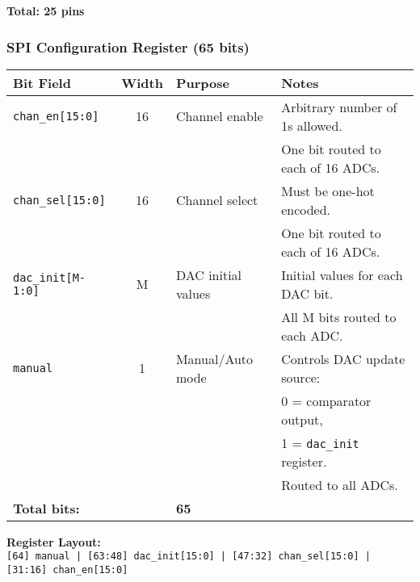 \documentclass[aspectratio=169]{beamer}
\begin{document}
\begin{frame}
\begin{center}
    \vspace{0.3cm}
    \textbf{Total: 25 pins}
  \end{center}
\end{frame}

\begin{frame}
  \frametitle{SPI Configuration Register (65 bits)}
  \begin{center}
    \scriptsize
    \begin{tabular}{|l|c|l|l|}
    \hline
    \textbf{Bit Field} & \textbf{Width} & \textbf{Purpose} & \textbf{Notes} \\
    \hline
    \texttt{chan\_en[15:0]} & 16 & Channel enable & Arbitrary number of 1s allowed. \\
                            &    &                & One bit routed to each of 16 ADCs. \\
    \hline
    \texttt{chan\_sel[15:0]} & 16 & Channel select & Must be one-hot encoded. \\
                             &    &                & One bit routed to each of 16 ADCs. \\
    \hline
    \texttt{dac\_init[M-1:0]} & M & DAC initial values & Initial values for each DAC bit. \\
                             &    &                    & All M bits routed to each ADC. \\
    \hline
    \texttt{manual} & 1 & Manual/Auto mode & Controls DAC update source: \\
                    &   &                  & 0 = comparator output, \\
                    &   &                  & 1 = \texttt{dac\_init} register. \\
                    &   &                  & Routed to all ADCs. \\
    \hline
    \multicolumn{2}{|l|}{\textbf{Total bits:}} & \textbf{65} & \\
    \hline
    \end{tabular}
    
    \vspace{0.4cm}
    \textbf{Register Layout:} \\
    \texttt{[64] manual | [63:48] dac\_init[15:0] | [47:32] chan\_sel[15:0] | [31:16] chan\_en[15:0]}
  \end{center}
\end{frame}
\end{document}
